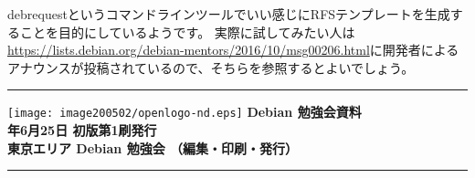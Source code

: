 \documentclass[mingoth,a4paper]{jsarticle}
\newcommand{\debmtgyear}{2016}
\newcommand{\debmtgmonth}{6}
\newcommand{\debmtgdate}{25}
\begin{document}
debrequestというコマンドラインツールでいい感じにRFSテンプレートを生成することを目的にしているようです。
実際に試してみたい人は\url{https://lists.debian.org/debian-mentors/2016/10/msg00206.html}に開発者によるアナウンスが投稿されているので、そちらを参照するとよいでしょう。

\cleartooddpage

%
\mbox{}\newpage
\mbox{}\newpage


\vspace*{15cm}
\hrule
\vspace{2mm}
\texttt{[image: image200502/openlogo-nd.eps]}
\noindent \Large \bf Debian 勉強会資料\\
\noindent \normalfont \debmtgyear{}年\debmtgmonth{}月\debmtgdate{}日 \hspace{5mm}  初版第1刷発行\\
\noindent \normalfont 東京エリア Debian 勉強会 （編集・印刷・発行）\\
\hrule
\end{document}

